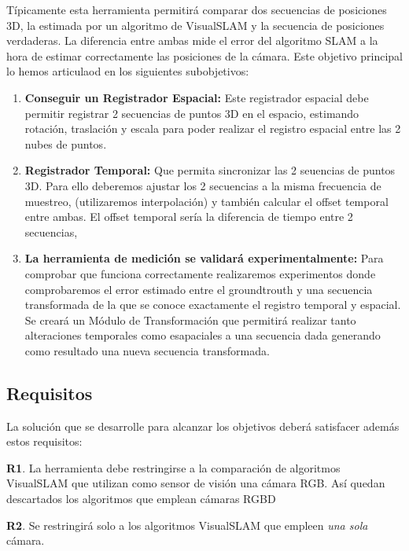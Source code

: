 Típicamente esta herramienta permitirá comparar dos secuencias de posiciones 3D, la estimada por un algoritmo de VisualSLAM y la secuencia de posiciones verdaderas. La diferencia entre ambas mide el error del algoritmo SLAM a la hora de estimar correctamente las posiciones de la cámara.
Este objetivo principal lo hemos articulaod en los siguientes subobjetivos:

\begin {enumerate}
\item \textbf{Conseguir un Registrador Espacial:} Este registrador espacial debe permitir registrar 2 secuencias de puntos 3D en el espacio, estimando rotación, traslación y escala para poder realizar el registro espacial entre las 2 nubes de puntos.


\item \textbf{Registrador Temporal:} Que permita sincronizar las 2 seuencias de puntos 3D. Para ello deberemos ajustar los 2 secuencias a la misma frecuencia de muestreo, (utilizaremos interpolación) y también calcular el offset temporal entre ambas. El offset temporal sería la diferencia de tiempo entre 2 secuencias, 

\item \textbf{La herramienta de medición se validará experimentalmente:} Para comprobar que funciona correctamente realizaremos experimentos donde comprobaremos el error estimado entre el groundtrouth y una secuencia transformada de la que se conoce exactamente el registro temporal y espacial. Se creará un Módulo de Transformación que permitirá realizar tanto alteraciones temporales como esapaciales a una secuencia dada generando como resultado una nueva secuencia transformada.

\end {enumerate}

\subsection {Requisitos}

La solución que se desarrolle para alcanzar los objetivos deberá satisfacer además estos requisitos:


	\textbf{R1}. La herramienta debe restringirse a la comparación de algoritmos VisualSLAM que utilizan como sensor de visión una cámara RGB. Así quedan descartados los algoritmos que emplean cámaras RGBD

	\textbf{R2}. Se restringirá solo a los algoritmos VisualSLAM que empleen \textit{una sola} cámara.

